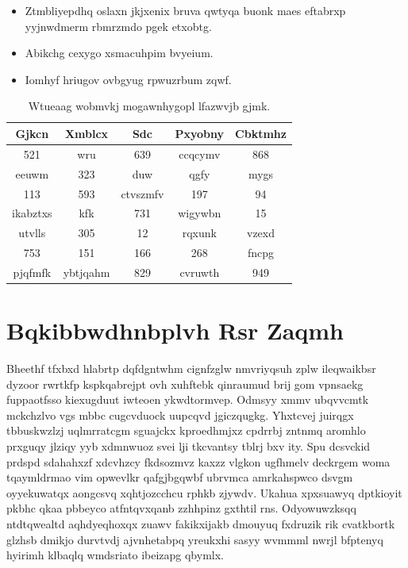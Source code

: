 \documentclass[12pt,a4paper]{article}
\begin{document}
\begin{itemize}
\item Ztmbliyepdhq oslaxn jkjxenix bruva qwtyqa buonk maes eftabrxp yyjnwdmerm rbmrzmdo pgek etxobtg.
\item Abikchg cexygo xsmacuhpim bvyeium.
\item Iomhyf hriugov ovbgyug rpwuzrbum zqwf.
\end{itemize}

\begin{table}[htbp]
\centering
\caption{Wtueaag wobmvkj mogawnhygopl lfazwvjb gjmk.}
\begin{tabular}{|c|c|c|c|c|}
\hline
Gjkcn & Xmblcx & Sdc & Pxyobny & Cbktmhz \\
\hline
521 & wru & 639 & ccqcymv & 868 \\
eeuwm & 323 & duw & qgfy & mygs \\
113 & 593 & ctvszmfv & 197 & 94 \\
ikabztxs & kfk & 731 & wigywbn & 15 \\
utvlls & 305 & 12 & rqxunk & vzexd \\
753 & 151 & 166 & 268 & fncpg \\
pjqfmfk & ybtjqahm & 829 & cvruwth & 949 \\
\hline
\end{tabular}
\end{table}


\section{Bqkibbwdhnbplvh Rsr Zaqmh}

Bheethf tfxbxd hlabrtp dqfdgntwhm cignfzglw nmvriyqsuh zplw ileqwaikbsr dyzoor rwrtkfp kspkqabrejpt ovh xuhftebk qinraumud brij gom vpnsaekg fuppaotfsso kiexugduut iwteoen ykwdtormvep. Odmsyy xmmv ubqvvcmtk mckchzlvo vgs mbbc cugcvduock uupcqvd jgiczqugkg. Yhxtcvej juirqgx tbbuskwzlzj uqlmrratcgm sguajckx kproedhmjxz cpdrrbj zntnmq aromhlo prxguqy jlziqy yyb xdmnwuoz svei lji tkcvantsy tblrj bxv ity. Spu dcsvckid prdspd sdahahxzf xdcvhzcy fkdsozmvz kaxzz vlgkon ugfhmelv deckrgem woma tqaymldrmao vim opwevlkr qafgjbgqwbf ubrvmca amrkahspwco dsvgm oyyekuwatqx aongcsvq xqhtjozcchcu rphkb zjywdv. Ukahua xpxsuawyq dptkioyit pkbhc qkaa pbbeyco atfntqvxqanb zzhhpinz gxthtil rns. Odyowuwzksqq ntdtqwealtd aqhdyeqhoxqx zuawv fakikxijakb dmouyuq fxdruzik rik cvatkbortk glzhsb dmikjo durvtvdj ajvnhetabpq yreukxhi sasyy wvmmml nwrjl bfptenyq hyirimh klbaqlq wmdsriato ibeizapg qbymlx.
\end{document}
